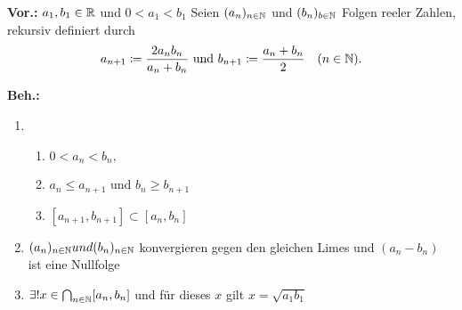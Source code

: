 \documentclass{gadsescript}
\begin{document}
\maketitle

\textbf{Vor.:} $ a_1, b_1 \in \mathbb{R} $ und $ 0 < a_1 < b_1 $ Seien $ (a_n)_{n \in \mathbb{N} } $ und $ (b_n)_{b \in \mathbb{N} } $ Folgen reeler Zahlen, rekursiv definiert durch 
\[
	a_{n+1} \coloneqq \frac{ 2 a_n b_n }{ a_n + b_n } \text{ und } b_{n+1} \coloneqq \frac{ a_n + b_n }{ 2 } \quad (n \in \mathbb{N} ).
\]

\textbf{Beh.:}
\begin{enumerate}[label=(\alph*)]
	\item
		\begin{enumerate}[label=(\roman*)]
			\item $ 0 < a_n < b_n, $ 
			\item $ a_n \leq a_{n+1} $ und $ b_n \geq b_{n+1} $ 
			\item $ [a_{n+1}, b_{n+1}] \subset [a_n, b_n] $
		\end{enumerate}
	\item $ (a_n)_{n \in \mathbb{N} } und (b_n)_{n \in \mathbb{N} } $ konvergieren gegen den gleichen Limes und $ (a_n - b_n)  $ ist eine Nullfolge
	\item $ \exists ! x \in \bigcap_{n \in \mathbb{N} } [a_n, b_n]  $ und für dieses $ x $ gilt $ x = \sqrt{a_1b_1}  $ 
\end{enumerate}
\end{document}
